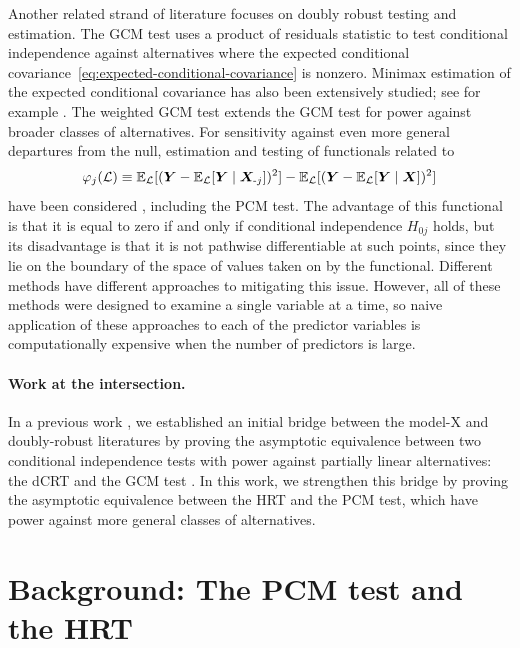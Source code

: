 \documentclass[12pt]{article}
\theoremstyle{definition}
\theoremstyle{remark}
\newcommand{\E}{\mathbb E}								%
\newcommand{\prx}{\bm X}								%
\newcommand{\pry}{{\bm Y}}								%
\newcommand{\law}{\mathcal L}							%
\newcommand{\minus}{\textnormal{-}} 						    %
\begin{document}
	Another related strand of literature focuses on doubly robust testing and estimation. The GCM test \citep{Shah2018} uses a product of residuals statistic to test conditional independence against alternatives where the expected conditional covariance~\eqref{eq:expected-conditional-covariance} is nonzero. Minimax estimation of the expected conditional covariance has also been extensively studied; see for example \citet{Robins2008,Robins2009}. The weighted GCM test \citep{Scheidegger2022a} extends the GCM test for power against broader classes of alternatives. For sensitivity against even more general departures from the null, estimation and testing of functionals related to
	\begin{equation}
	\varphi_j(\law) \equiv \E_{\law}[(\pry - \E_{\law}[\pry \mid \prx_{\minus j}])^2] - \E_{\law}[(\pry - \E_{\law}[\pry \mid \prx])^2]
	\label{eq:nonlinear-r-squared}
	\end{equation}
	have been considered \citep{Zhang2020,Williamson2021,Williamson2021a,Dai2022,Lundborg2022a,Hudson2023,Verdinelli2024}, including the PCM test. The advantage of this functional is that it is equal to zero if and only if conditional independence $H_{0j}$ holds, but its disadvantage is that it is not pathwise differentiable at such points, since they lie on the boundary of the space of values taken on by the functional. Different methods have different approaches to mitigating this issue. However, all of these methods were designed to examine a single variable at a time, so naive application of these approaches to each of the predictor variables is computationally expensive when the number of predictors is large.

	\paragraph{Work at the intersection.}

	In a previous work \citep{Niu2022}, we established an initial bridge between the model-X and doubly-robust literatures by proving the asymptotic equivalence between two conditional independence tests with power against partially linear alternatives: the dCRT \citep{Liu2020} and the GCM test \citep{Shah2018}. In this work, we strengthen this bridge by proving the asymptotic equivalence between the HRT and the PCM test, which have power against more general classes of alternatives.

	\section{Background: The PCM test and the HRT}
\end{document}
